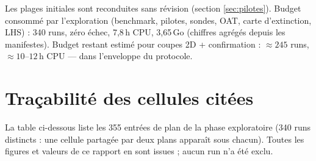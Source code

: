 \documentclass[11pt,a4paper]{article}
\begin{document}
Les plages initiales sont reconduites sans révision (section
\ref{sec:pilotes}). Budget consommé par l'exploration (benchmark,
pilotes, sondes, OAT, carte d'extinction, LHS) : 340 runs, zéro échec,
7{,}8\,h CPU, 3{,}65\,Go (chiffres agrégés depuis les manifestes).
Budget restant estimé pour coupes 2D + confirmation :
$\approx245$ runs, $\approx10$--$12$\,h CPU — dans l'enveloppe du
protocole.

\appendix

\section{Traçabilité des cellules citées}
\label{sec:annexe}

La table ci-dessous liste les 355 entrées de plan de la phase
exploratoire (340 runs distincts : une cellule partagée par deux plans
apparaît sous chacun). Toutes les figures et valeurs de ce rapport en
sont issues ; aucun run n'a été exclu.


\end{document}
